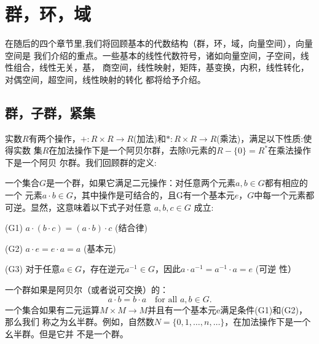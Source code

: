 \chapter{群，环，域}

在随后的四个章节里,我们将回顾基本的代数结构（群，环，域，向量空间），向量空间是
我们介绍的重点。一些基本的线性代数符号，诸如向量空间，子空间，线性组合，线性无关，基，
商空间，线性映射，矩阵，基变换，内积，线性转化，对偶空间，超空间，线性映射的转化
都将给予介绍。
\section{群，子群，紧集}
实数$R$有两个操作，$+ : R\times R\to R$(加法)和$*:R\times R\to R$(乘法)，满足以下性质:使得实数
集$R$在加法操作下是一个阿贝尔群，去除0元素的$R-\{0\}=R^*$在乘法操作下是一个阿贝
尔群。我们回顾群的定义:
\begin{definition}
  一个集合$G$是一个群，如果它满足二元操作：对任意两个元素$a,b\in G$都有相应的一个
  元素$a\cdot b\in G$，其中操作是可结合的，且G有一个基本元$e$，$G$中每一个元素都可逆。显然，这意味着以下式子对任意
  $a,b,c\in G$ 成立:

  (G1) $a\cdot(b\cdot c) = (a\cdot b)\cdot c $ \hfill(结合律)

  (G2) $a\cdot e=e\cdot a=a$ \hfill (基本元)

  (G3) 对于任意$a\in G$，存在逆元$a^{-1}\in G$，因此$a\cdot a^{-1}=a^{-1}\cdot a=e$ \hfill (可逆
  性）
\end{definition}
一个群如果是阿贝尔（或者说可交换）的：
\[
  a\cdot b = b\cdot a \quad \textrm{for all } a,b\in G.
  \]
一个集合如果有二元运算$M\times M\to M$并且有一个基本元e满足条件(G1)和(G2)，那么我们
称之为幺半群。例如，自然数$N=\{0,1,\ldots,n,\ldots\}$，在加法操作下是一个幺半群。但是它并
不是一个群。

